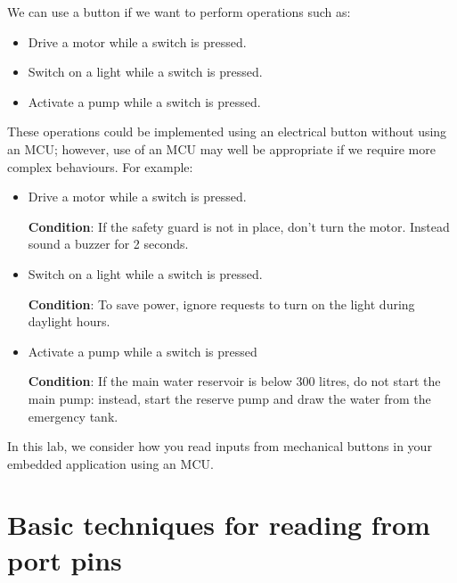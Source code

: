 We can use a button if we want to perform operations such as:
\begin{itemize}
    \item Drive a motor while a switch is pressed.
    \item Switch on a light while a switch is pressed.
    \item Activate a pump while a switch is pressed.
\end{itemize}
These operations could be implemented using an electrical button without using an MCU; however, use of an MCU may well be appropriate if we require more complex behaviours. For example:
\begin{itemize}
    \item Drive a motor while a switch is pressed. 
    
    \textbf{Condition}: If the safety guard is not in place, don't turn the motor. Instead sound a buzzer for 2 seconds. 
    \item Switch on a light while a switch is pressed.
    
    \textbf{Condition}: To save power, ignore requests to turn on the light during daylight hours. 
    
    \item Activate a pump while a switch is pressed
    
    \textbf{Condition}: If the main water reservoir is below 300 litres, do not start the main pump: instead, start the reserve pump and draw the water from the emergency tank. 
\end{itemize}

In this lab, we consider how you read inputs from mechanical buttons in your embedded application using an MCU. 

\newpage
\section{Basic techniques for reading from port pins}
